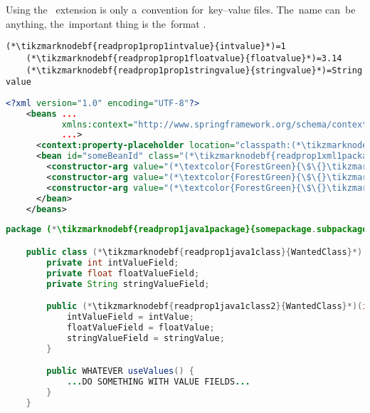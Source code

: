 \note Using the~ extension is only a~convention for~key--value files.
The~name can~be anything, the~important thing is the~format .
\newpage

\begin{lstlisting}[title={A \mboxtextit{.properties} file called \tikzmarknodebf{readprop1prop1filename}{\textit{constructor.properties}}}]
    (*\tikzmarknodebf{readprop1prop1intvalue}{intvalue}*)=1
    (*\tikzmarknodebf{readprop1prop1floatvalue}{floatvalue}*)=3.14
    (*\tikzmarknodebf{readprop1prop1stringvalue}{stringvalue}*)=String value
\end{lstlisting}
\begin{lstlisting}[language=XML, title={Configuration XML}]
    <?xml version="1.0" encoding="UTF-8"?>
    <beans ...
           xmlns:context="http://www.springframework.org/schema/context"
           ...>
      <context:property-placeholder location="classpath:(*\tikzmarknodebf{readprop1xml1filename}{constructor.properties}[ForestGreen]*)" file-encoding="utf-8"/>
      <bean id="someBeanId" class="(*\tikzmarknodebf{readprop1xml1package}{somepackage.subpackage}[ForestGreen]*).(*\tikzmarknodebf{readprop1xml1class}{WantedClass}[ForestGreen]*)">
        <constructor-arg value="(*\textcolor{ForestGreen}{\$\{}\tikzmarknodebf{readprop1xml1intvalue}{intvalue}[ForestGreen]\textcolor{ForestGreen}{\}}*)"/>
        <constructor-arg value="(*\textcolor{ForestGreen}{\$\{}\tikzmarknodebf{readprop1xml1floatvalue}{floatvalue}[ForestGreen]\textcolor{ForestGreen}{\}}*)"/>
        <constructor-arg value="(*\textcolor{ForestGreen}{\$\{}\tikzmarknodebf{readprop1xml1stringvalue}{stringvalue}[ForestGreen]\textcolor{ForestGreen}{\}}*)"/>
      </bean>
    </beans>
\end{lstlisting}
\begin{lstlisting}[language=Java, title={Wanted class with the constructor}]
    package (*\tikzmarknodebf{readprop1java1package}{somepackage.subpackage}*);

    public class (*\tikzmarknodebf{readprop1java1class}{WantedClass}*) implements WantedInterface {
        private int intValueField;
        private float floatValueField;
        private String stringValueField;

        public (*\tikzmarknodebf{readprop1java1class2}{WantedClass}*)(int intValue, float floatValue, String stringValue) {
            intValueField = intValue;
            floatValueField = floatValue;
            stringValueField = stringValue;
        }

        public WHATEVER useValues() {
            ...DO SOMETHING WITH VALUE FIELDS...
        }
    }
\end{lstlisting}
